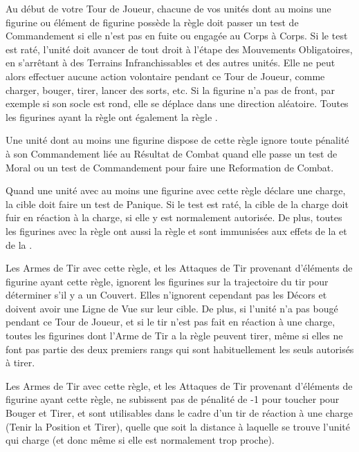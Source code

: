 
Au début de votre Tour de Joueur, chacune de vos unités dont au moins une figurine ou élément de figurine possède la règle \stupidity{} doit passer un test de Commandement si elle n'est pas en fuite ou engagée au Corps à Corps. Si le test est raté, l'unité doit avancer de  tout droit à l'étape des Mouvements Obligatoires, en s'arrêtant à  des Terrains Infranchissables et des autres unités. Elle ne peut alors effectuer aucune action volontaire pendant ce Tour de Joueur, comme charger, bouger, tirer, lancer des sorts, etc. Si la figurine n'a pas de front, par exemple si son socle est rond, elle se déplace dans une direction aléatoire. Toutes les figurines ayant la règle \stupidity{} ont également la règle \immunetopsychology{}.


Une unité dont au moins une figurine dispose de cette règle ignore toute pénalité à son Commandement liée au Résultat de Combat quand elle passe un test de Moral ou un test de Commandement pour faire une Reformation de Combat.


Quand une unité avec au moins une figurine avec cette règle déclare une charge, la cible doit faire un test de Panique. Si le test est raté, la cible de la charge doit fuir en réaction à la charge, si elle y est normalement autorisée. De plus, toutes les figurines avec la règle \terror{} ont aussi la règle \fear{} et sont immunisées aux effets de la \fear{} et de la \terror{}.

\newpage
{}

Les Armes de Tir avec cette règle, et les Attaques de Tir provenant d'éléments de figurine ayant cette règle, ignorent les figurines sur la trajectoire du tir pour déterminer s'il y a un Couvert. Elles n'ignorent cependant pas les Décors et doivent avoir une Ligne de Vue sur leur cible. De plus, si l'unité n'a pas bougé pendant ce Tour de Joueur, et si le tir n'est pas fait en réaction à une charge, toutes les figurines dont l'Arme de Tir a la règle \volleyfire{} peuvent tirer, même si elles ne font pas partie des deux premiers rangs qui sont habituellement les seuls autorisés à tirer.


Les Armes de Tir avec cette règle, et les Attaques de Tir provenant d'éléments de figurine ayant cette règle, ne subissent pas de pénalité de -1 pour toucher pour Bouger et Tirer, et sont utilisables dans le cadre d'un tir de réaction à une charge (Tenir la Position et Tirer), quelle que soit la distance à laquelle se trouve l'unité qui charge (et donc même si elle est normalement trop proche).

